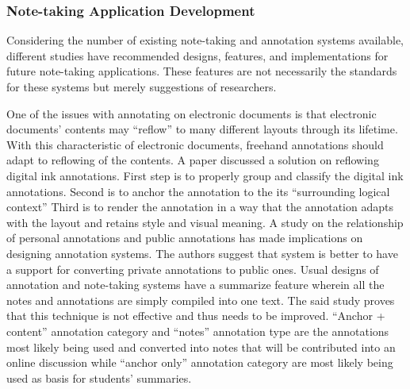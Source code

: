 \subsubsection{Note-taking Application Development}

Considering the number of existing note-taking and annotation systems available, different studies have recommended designs, features, and implementations for future note-taking applications. These features are not necessarily the standards for these systems but merely suggestions of researchers.

One of the issues with annotating on electronic documents is that electronic documents' contents may ``reflow'' to many different layouts through its lifetime. With this characteristic of electronic documents, freehand annotations should adapt to reflowing of the contents. A paper \cite{Bargeron03reflowingdigital} discussed a solution on reflowing digital ink annotations. First step is to properly group and classify the digital ink annotations. Second is to anchor the annotation to the its ``surrounding logical context'' Third is to render the annotation in a way that the annotation adapts with the layout and retains style and visual meaning. A study \cite{citeulike:162144} on the relationship of personal annotations and public annotations has made implications on designing annotation systems. The authors suggest that system is better to have a support for converting private annotations to public ones. Usual designs of annotation and note-taking systems have a summarize feature wherein all the notes and annotations are simply compiled into one text. The said study proves that this technique is not effective and thus needs to be improved. ``Anchor + content'' annotation category and ``notes'' annotation type are the annotations most likely being used and converted into notes that will be contributed into an online discussion while ``anchor only'' annotation category are most likely being used as basis for students' summaries.

\pagebreak

